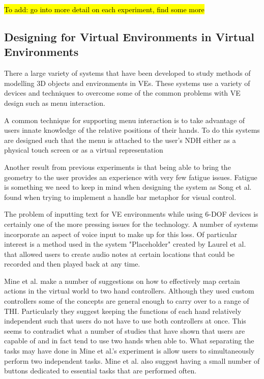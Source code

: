 \documentclass{sig-alternate-05-2015}
\begin{document}
 \hl{To add: go into more detail on each experiment, find some more}
\subsection{Designing for Virtual Environments in Virtual Environments}
There a large variety of systems that have been developed to study methods of modelling 3D objects and environments in VEs. These systems use a variety of devices and techniques to overcome some of the common problems with VE design such as menu interaction.

A common technique for supporting menu interaction is to take advantage of users innate knowledge of the relative positions of their hands\cite{Bowman1998, Buxton1986}. To do this systems are designed such that the menu is attached to the user's NDH either as a physical touch screen\cite{Wang2013,Mine2014} or as a virtual representation\cite{Jerald2013}

Another result from previous experiments is that being able to bring the geometry to the user provides an experience with very few fatigue issues\cite{Jerald2013}. Fatigue is something we need to keep in mind when designing the system as Song et al. found when trying to implement a handle bar metaphor for visual control\cite{Song2012}.

The problem of inputting text for VE environments while using 6-DOF devices is certainly one of the more pressing issues for the technology. A number of systems incorporate an aspect of voice input to make up for this loss\cite{Ponto2013,Toma2012}. Of particular interest is a method used in the system "Placeholder" created by Laurel et al. that allowed users to create audio notes at certain locations that could be recorded and then played back at any time\cite{Laurel1994}.

Mine et al. make a number of suggestions on how to effectively map certain actions in the virtual world to two hand controllers\cite{Mine2014}. Although they used custom controllers some of the concepts are general enough to carry over to a range of THI. Particularly they suggest keeping the functions of each hand relatively independent such that users do not have to use both controllers at once. This seems to contradict what a number of studies that have shown that users are capable of and in fact tend to use two hands when able to\cite{Buxton1986,Hinckley1994}. What separating the tasks may have done in Mine et al.'s experiment is allow users to simultaneously perform two independent tasks.  Mine et al. also suggest having a small number of buttons dedicated to essential tasks that are performed often\cite{Mine2014}.
\end{document}

